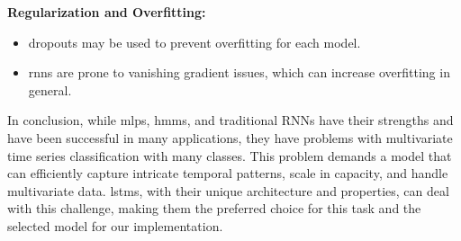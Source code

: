 \textbf{Regularization and Overfitting:}
\begin{itemize}
    \item dropouts may be used to prevent overfitting for each model\cite{srivastava14a}.
    \item \acp{rnn} are prone to vanishing gradient issues, which can increase overfitting in general. \cite{rnn_difficulties_2013}
\end{itemize}

In conclusion, while \acp{mlp}, \acp{hmm}, and traditional RNNs have their strengths and have been successful in many applications, they have problems with multivariate time series classification with many classes.
This problem demands a model that can efficiently capture intricate temporal patterns, scale in capacity, and handle multivariate data.
\acp{lstm}, with their unique architecture and properties, can deal with this challenge, making them the preferred choice for this task and the selected model for our implementation.

